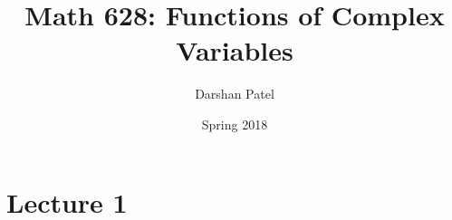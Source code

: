 \documentclass[12pt]{article}
\begin{document}
\theoremstyle{definition}
\newtheorem{theorem}{Theorem}[section]
\newtheorem{definition}{Definition}[section]
\newtheorem{example}{Example}[section]
\newtheorem{question}{Question}[section]

\newcommand{\set}[1]{\Big\{ #1 \Big\}}
\newcommand{\reals}{\mathbb{R}}
\newcommand{\complex}{\mathbb{C}}
\newcommand{\abi}{a + bi}
\newcommand{\z}{z = \abi}
\newcommand{\zabin}[2]{z_{#1} = a_{#1} #2 b_{#1}}
\newcommand{\conj}[1]{\overline{#1}}
\renewcommand{\mod}[1]{\abs{#1}}
\newcommand{\cosisin}[1]{\cos\Big( #1 \Big) + i\sin\Big( #1 \Big)}
\newcommand{\union}{\bigcup} 
\newcommand{\intersection}{\bigcap}
\renewcommand{\O}{\mathcal{O}}
\newcommand{\half}{\frac{1}{2}}
\newcommand{\mobt}{M\"obius transformation }
\newcommand{\hatcom}{\hat{\complex}}
\newcommand{\e}[1]{e^{#1}}
\newcommand{\res}[1]{\underset{z=#1}{\text{Res }}}




\title{Math 628: Functions of Complex Variables}
\author{Darshan Patel}
\date{Spring 2018}
\maketitle

\tableofcontents

\section{Lecture 1} 
\end{document}
